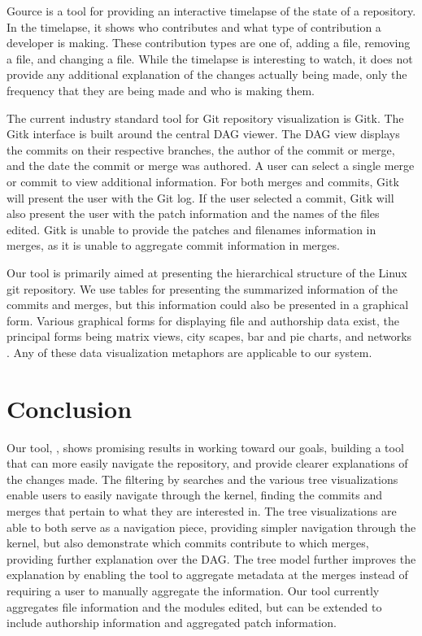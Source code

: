 \documentclass[conference, draftclsnofoot, draft]{IEEEtran}
\begin{document}
Gource is a tool for providing an interactive timelapse of the state of a
repository\cite{Caudwell2010}. In the timelapse, it shows who contributes and what
type of contribution a developer is making. These contribution types are one of,
adding a file, removing a file, and changing a file. While the timelapse is
interesting to watch, it does not provide any additional explanation of the changes
actually being made, only the frequency that they are being made and who is making
them.

The current industry standard tool for Git repository visualization is Gitk. The
Gitk interface is built around the central DAG viewer. The DAG view displays the
commits on their respective branches, the author of the commit or merge, and the
date the commit or merge was authored. A user can select a single merge or commit
to view additional information. For both merges and commits, Gitk will present the
user with the Git log. If the user selected a commit, Gitk will also present the
user with the patch information and the names of the files edited. Gitk is unable to
provide the patches and filenames information in merges, as it is unable to
aggregate commit information in merges.

Our tool is primarily aimed at presenting the hierarchical structure of the Linux
git repository. We use tables for presenting the summarized information of the
commits and merges, but this information could also be presented in a graphical
form. Various graphical forms for displaying file and authorship data exist, the
principal forms being matrix views, city scapes, bar and pie charts, and networks
\cite{Eick2002}. Any of these data visualization metaphors are applicable to our
system.

\section{Conclusion}

Our tool, \tool, shows promising results in working toward our goals, building a tool that
can more easily navigate the repository, and provide clearer explanations of the
changes made. The filtering by searches and the various tree visualizations enable
users to easily navigate through the kernel, finding the commits and merges that
pertain to what they are interested in. The tree visualizations are able to both
serve as a navigation piece, providing simpler navigation through the kernel, but
also demonstrate which commits contribute to which merges, providing further
explanation over the DAG. The tree model further improves the explanation by enabling
the tool to aggregate metadata at the merges instead of requiring a user to manually
aggregate the information. Our tool currently aggregates file information and the
modules edited, but can be extended to include authorship information and aggregated
patch information.
\end{document}
